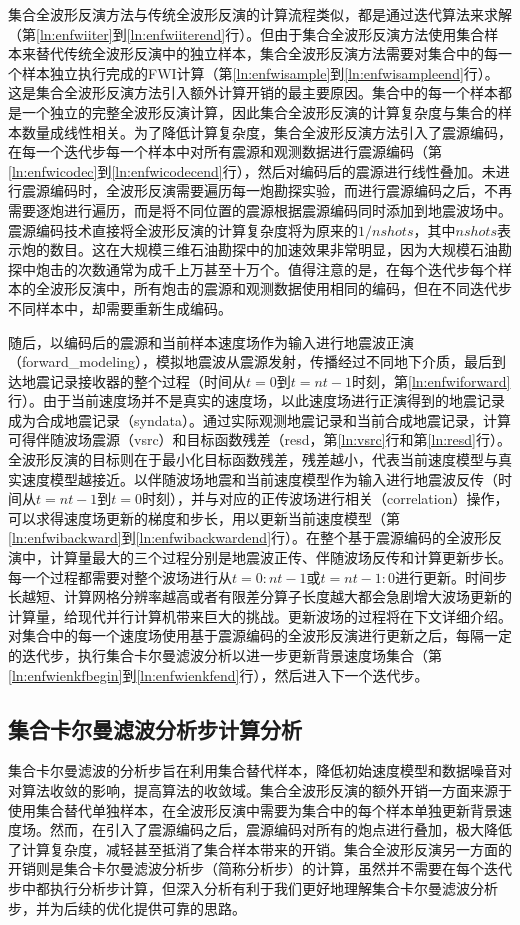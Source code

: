集合全波形反演方法与传统全波形反演的计算流程类似，都是通过迭代算法来求解（第\ref{ln:enfwiiter}到\ref{ln:enfwiiterend}行）。但由于集合全波形反演方法使用集合样本来替代传统全波形反演中的独立样本，集合全波形反演方法需要对集合中的每一个样本独立执行完成的FWI计算（第\ref{ln:enfwisample}到\ref{ln:enfwisampleend}行）。这是集合全波形反演方法引入额外计算开销的最主要原因。集合中的每一个样本都是一个独立的完整全波形反演计算，因此集合全波形反演的计算复杂度与集合的样本数量成线性相关。为了降低计算复杂度，集合全波形反演方法引入了震源编码，在每一个迭代步每一个样本中对所有震源和观测数据进行震源编码（第\ref{ln:enfwicodec}到\ref{ln:enfwicodecend}行），然后对编码后的震源进行线性叠加。未进行震源编码时，全波形反演需要遍历每一炮勘探实验，而进行震源编码之后，不再需要逐炮进行遍历，而是将不同位置的震源根据震源编码同时添加到地震波场中。震源编码技术直接将全波形反演的计算复杂度将为原来的$1/nshots$，其中$nshots$表示炮的数目。这在大规模三维石油勘探中的加速效果非常明显，因为大规模石油勘探中炮击的次数通常为成千上万甚至十万个。值得注意的是，在每个迭代步每个样本的全波形反演中，所有炮击的震源和观测数据使用相同的编码，但在不同迭代步不同样本中，却需要重新生成编码。

随后，以编码后的震源和当前样本速度场作为输入进行地震波正演（forward\_modeling），模拟地震波从震源发射，传播经过不同地下介质，最后到达地震记录接收器的整个过程（时间从$t=0$到$t=nt-1$时刻，第\ref{ln:enfwiforward}行）。由于当前速度场并不是真实的速度场，以此速度场进行正演得到的地震记录成为合成地震记录（syndata）。通过实际观测地震记录和当前合成地震记录，计算可得伴随波场震源（vsrc）和目标函数残差（resd，第\ref{ln:vsrc}行和第\ref{ln:resd}行）。全波形反演的目标则在于最小化目标函数残差，残差越小，代表当前速度模型与真实速度模型越接近。以伴随波场地震和当前速度模型作为输入进行地震波反传（时间从$t=nt-1$到$t=0$时刻），并与对应的正传波场进行相关（correlation）操作，可以求得速度场更新的梯度和步长，用以更新当前速度模型（第\ref{ln:enfwibackward}到\ref{ln:enfwibackwardend}行）。在整个基于震源编码的全波形反演中，计算量最大的三个过程分别是地震波正传、伴随波场反传和计算更新步长。每一个过程都需要对整个波场进行从$t=0:nt-1$或$t=nt-1:0$进行更新。时间步长越短、计算网格分辨率越高或者有限差分算子长度越大都会急剧增大波场更新的计算量，给现代并行计算机带来巨大的挑战。更新波场的过程将在下文详细介绍。对集合中的每一个速度场使用基于震源编码的全波形反演进行更新之后，每隔一定的迭代步，执行集合卡尔曼滤波分析以进一步更新背景速度场集合（第\ref{ln:enfwienkfbegin}到\ref{ln:enfwienkfend}行），然后进入下一个迭代步。

\subsection{集合卡尔曼滤波分析步计算分析}
集合卡尔曼滤波的分析步旨在利用集合替代样本，降低初始速度模型和数据噪音对对算法收敛的影响，提高算法的收敛域。集合全波形反演的额外开销一方面来源于使用集合替代单独样本，在全波形反演中需要为集合中的每个样本单独更新背景速度场。然而，在引入了震源编码之后，震源编码对所有的炮点进行叠加，极大降低了计算复杂度，减轻甚至抵消了集合样本带来的开销。集合全波形反演另一方面的开销则是集合卡尔曼滤波分析步（简称分析步）的计算，虽然并不需要在每个迭代步中都执行分析步计算，但深入分析有利于我们更好地理解集合卡尔曼滤波分析步，并为后续的优化提供可靠的思路。

